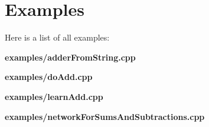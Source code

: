 \section{Examples}
Here is a list of all examples:\begin{CompactItemize}
\item 
{\bf examples/adderFromString.cpp}
\item 
{\bf examples/doAdd.cpp}
\item 
{\bf examples/learnAdd.cpp}
\item 
{\bf examples/networkForSumsAndSubtractions.cpp}
\end{CompactItemize}
